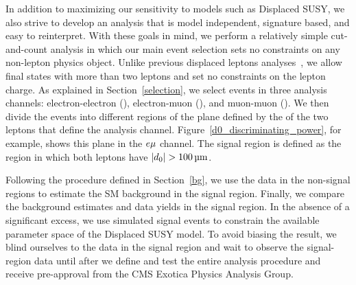 In addition to maximizing our sensitivity to models such as Displaced SUSY, we also strive to develop an analysis that is model independent, signature based, and easy to reinterpret. With these goals in mind, we perform a relatively simple cut-and-count analysis in which our main event selection sets no constraints on any non-lepton physics object. Unlike previous displaced leptons analyses~\cite{displaced_leptons_run1, displaced_leptons_bing}, we allow final states with more than two leptons and set no constraints on the lepton charge. As explained in Section~\ref{selection}, we select events in three analysis channels: electron-electron (\Pe\Pe), electron-muon (\Pe\Pgm), and muon-muon (\Pgm\Pgm). We then divide the events into different regions of the plane defined by the \ad of the two leptons that define the analysis channel. Figure~\ref{d0_discriminating_power}, for example, shows this plane in the $e{\mu}$ channel. The signal region is defined as the region in which both leptons have $\ad>\SI{100}{\um}$.

Following the procedure defined in Section~\ref{bg}, we use the data in the non-signal regions to estimate the SM background in the signal region. Finally, we compare the background estimates and data yields in the signal region. In the absence of a significant excess, we use simulated signal events to constrain the available parameter space of the Displaced SUSY model. To avoid biasing the result, we blind ourselves to the data in the signal region and wait to observe the signal-region data until after we define and test the entire analysis procedure and receive pre-approval from the CMS Exotica Physics Analysis Group.


\pagebreak